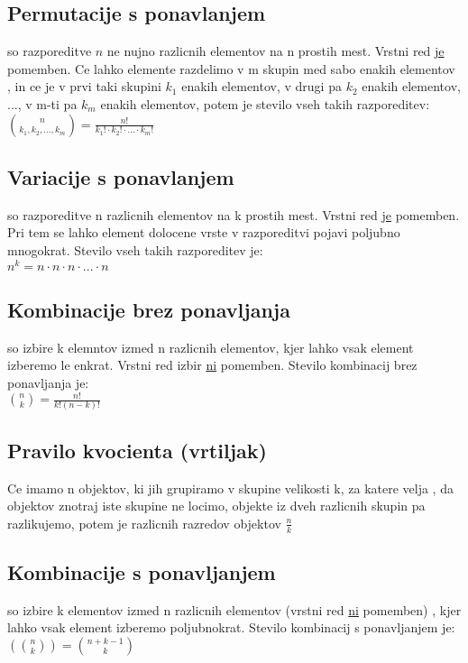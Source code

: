 \subsection*{Permutacije s ponavlanjem}
so razporeditve $n$ ne nujno razlicnih elementov na n prostih mest. Vrstni red
\underline{je} pomemben. Ce lahko elemente razdelimo v m skupin med sabo enakih elementov
, in ce je v prvi taki skupini $k_1$ enakih elementov, v drugi pa $k_2$ enakih elementov,
..., v m-ti pa $k_m$ enakih elementov, potem je stevilo vseh takih razporeditev:\\
$\binom{n}{k_1,k_2,...,k_m}=\frac{n!}{k_1!\cdot k_2!\cdot ...\cdot k_m!}$

\subsection*{Variacije s ponavlanjem}
so razporeditve n razlicnih elementov na k prostih mest. Vrstni red \underline{je} 
pomemben. Pri tem se lahko element dolocene vrste v razporeditvi pojavi poljubno
mnogokrat. Stevilo vseh takih razporeditev je:\\
$n^k=n\cdot n\cdot n\cdot ...\cdot n$

\subsection*{Kombinacije brez ponavljanja}
so izbire k elemntov izmed n razlicnih elementov, kjer lahko vsak element izberemo
le enkrat. Vrstni red izbir \underline{ni} pomemben. Stevilo kombinacij brez 
ponavljanja je:\\
$\binom{n}{k}=\frac{n!}{k!(n-k)!}$

\subsection*{Pravilo kvocienta (vrtiljak)}
Ce imamo n objektov, ki jih grupiramo v skupine velikosti k, za katere velja
, da objektov znotraj iste skupine ne locimo, objekte iz dveh razlicnih skupin pa
razlikujemo, potem je razlicnih razredov objektov $\frac{n}{k}$

\subsection*{Kombinacije s ponavljanjem}
so izbire k elementov izmed n razlicnih elementov (vrstni red \underline{ni} pomemben)
, kjer lahko vsak element izberemo poljubnokrat. Stevilo kombinacij s ponavljanjem
je:\\
$(\binom{n}{k})=\binom{n+k-1}{k}$